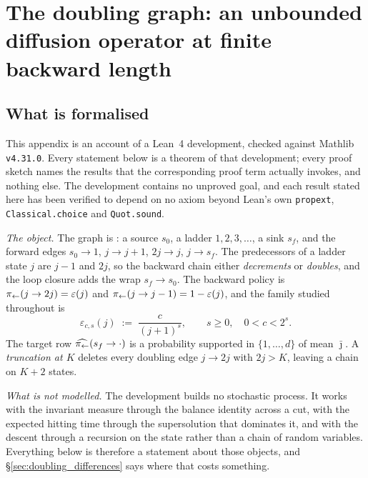 \section{The doubling graph: an unbounded diffusion operator at finite backward length}\label{app:doubling}

\subsection{What is formalised}\label{sec:doubling_formal}

This appendix is an account of a Lean~4 development, checked against Mathlib
\texttt{v4.31.0}. Every statement below is a theorem of that development; every proof sketch
names the results that the corresponding proof term actually invokes, and nothing else. The
development contains no unproved goal, and each result stated here has been verified to depend
on no axiom beyond Lean's own \texttt{propext}, \texttt{Classical.choice} and
\texttt{Quot.sound}.

\medskip\noindent
\emph{The object.} The graph is : a source
$s_0$, a ladder $1,2,3,\dots$, a sink $s_f$, and the forward edges $s_0\rightarrow1$,
$j\rightarrow j+1$, $2j\rightarrow j$, $j\rightarrow s_f$. The predecessors of a ladder state
$j$ are $j-1$ and $2j$, so the backward chain either \emph{decrements} or \emph{doubles}, and
the loop closure adds the wrap $s_f\rightarrow s_0$. The backward policy is
$\pi_{\leftarrow}(j\rightarrow2j)=\varepsilon(j)$ and
$\pi_{\leftarrow}(j\rightarrow j-1)=1-\varepsilon(j)$, and the family studied throughout is
\begin{equation}\label{eq:doubling_family}
    \varepsilon_{c,s}(j)\;:=\;\frac{c}{(j+1)^{s}},\qquad s\geq0,\quad 0<c<2^{s} .
\end{equation}
The target row $\widehat{\pi_{\leftarrow}}(s_f\rightarrow\cdot)$ is a probability supported in
$\{1,\dots,d\}$ of mean $\bar\jmath$. A \emph{truncation at $K$} deletes every doubling edge
$j\rightarrow2j$ with $2j>K$, leaving a chain on $K+2$ states.

\medskip\noindent
\emph{What is not modelled.} The development builds no stochastic process. It works with the
invariant measure through the balance identity across a cut, with the expected hitting time
through the supersolution that dominates it, and with the descent through a recursion on the
state rather than a chain of random variables. Everything below is therefore a statement about
those objects, and \S\ref{sec:doubling_differences} says where that costs something.


